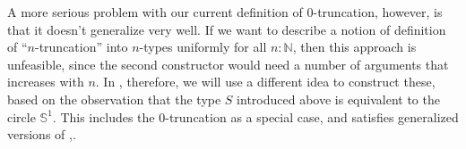 \documentclass[12pt]{article}
\newcommand{\N}{\ensuremath{\mathbb{N}}\xspace}
\newcommand{\Sn}{\mathbb{S}}
\let\nat\N
\begin{document}
%

%
%
A more serious problem with our current definition of $0$-truncation, however, is that it doesn't generalize very well.
If we want to describe a notion of definition of ``$n$-truncation'' into $n$-types uniformly for all $n:\nat$, then this approach is unfeasible, since the second constructor would need a number of arguments that increases with $n$.
In , therefore, we will use a different idea to construct these, based on the observation that the type $S$ introduced above is equivalent to the circle $\Sn^1$.
This includes the 0-truncation as a special case, and satisfies generalized versions of ,.
\end{document}
